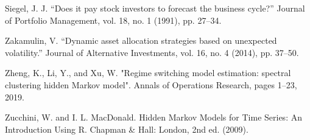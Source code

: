 Siegel, J. J. “Does it pay stock investors to forecast the business cycle?” Journal of Portfolio Management, vol. 18, no. 1 (1991), pp. 27–34.

Zakamulin, V. “Dynamic asset allocation strategies based on unexpected volatility.” Journal of Alternative Investments, vol. 16, no. 4 (2014), pp. 37–50.

Zheng, K., Li, Y., and Xu, W. "Regime switching model estimation: spectral clustering hidden Markov model". Annals of Operations Research, pages 1–23, 2019.

Zucchini, W. and I. L. MacDonald. Hidden Markov Models for Time Series: An Introduction Using R. Chapman \& Hall: London, 2nd ed. (2009).








